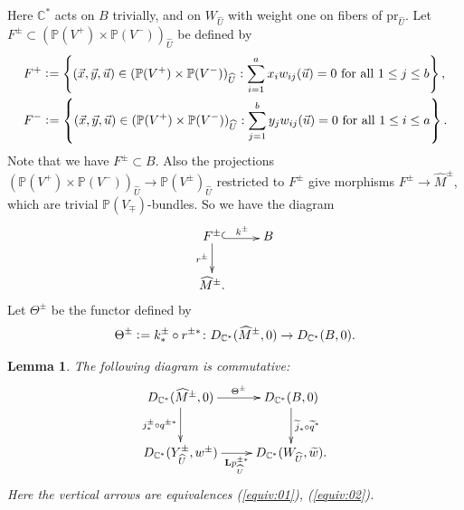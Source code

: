 \documentclass[11pt]{amsart}
\theoremstyle{plain}
\newtheorem{lem}[thm]{Lemma}
\newcommand{\dL}{\mathbf{L}}
\begin{document}
Here $\mathbb{C}^{\ast}$ acts on $B$ trivially, and
on $W_{\widehat{U}}$ with weight one 
on fibers of $\mathrm{pr}_{\widehat{U}}$. 
Let $F^{\pm} \subset (\mathbb{P}(V^+) \times \mathbb{P}(V^-))_{\widehat{U}}$
be defined by
\begin{align}\notag
&F^{+} \cneq \left\{(\vec{x}, \vec{y}, \vec{u}) \in 
(\mathbb{P}(V^+) \times \mathbb{P}(V^-))_{\widehat{U}} : 
\sum_{i=1}^a x_i w_{ij}(\vec{u})=0 \mbox{ for all }
1\le j\le b\right\}, \\
\notag
&F^- \cneq \left\{(\vec{x}, \vec{y}, \vec{u}) \in 
(\mathbb{P}(V^+) \times \mathbb{P}(V^-))_{\widehat{U}} : 
\sum_{j=1}^b y_j w_{ij}(\vec{u})=0 \mbox{ for all }
1\le i\le a\right\}.
\end{align}
Note that we have 
$F^{\pm} \subset B$. 
Also the projections
$(\mathbb{P}(V^+) \times \mathbb{P}(V^-))_{\widehat{U}} \to 
\mathbb{P}(V^{\pm})_{\widehat{U}}$
restricted to $F^{\pm}$ give 
morphisms 
$F^{\pm} \to \widehat{M}^{\pm}$, which are 
trivial $\mathbb{P}(V_{\mp})$-bundles. 
So we have the diagram
\begin{align*}
\xymatrix{
F^{\pm} 
\ar@<-0.3ex>@{^{(}->}[r]^-{k^{\pm}} \ar[d]_-{r^{\pm}} & B \\
\widehat{M}^{\pm}.  &
} 
\end{align*}
Let $\Theta^{\pm}$ be the functor defined by
\begin{align*}
\Theta^{\pm} \cneq k^{\pm}_{\ast} \circ 
r^{\pm \ast}  \colon 
D_{\mathbb{C}^{\ast}}(\widehat{M}^{\pm}, 0) \to D_{\mathbb{C}^{\ast}}(B, 0). 
\end{align*}
\begin{lem}\label{lem:commute1}
The following diagram is commutative: 
\begin{align}\label{dia:commute}
\xymatrix{
D_{\mathbb{C}^{\ast}}(\widehat{M}^{\pm}, 0) \ar[r]^-{\Theta^{\pm}} 
\ar[d]_-{j^{\pm}_{\ast}\circ q^{\pm \ast}}&
D_{\mathbb{C}^{\ast}}(B, 0) 
\ar[d]^-{\widetilde{j}_{\ast} \circ \widetilde{q}^{\ast}} \\
D_{\mathbb{C}^{\ast}}(Y_{\widehat{U}}^{\pm}, w^{\pm}) \ar[r]_-{\dL p_{\widehat{U}}^{\pm \ast}} & 
D_{\mathbb{C}^{\ast}}(W_{\widehat{U}}, \widetilde{w}).
}
\end{align}
Here the vertical arrows are equivalences (\ref{equiv:01}), (\ref{equiv:02}). 
\end{lem}
\end{document}
